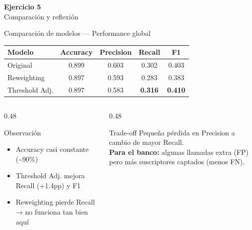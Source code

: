 \documentclass[aspectratio=169, 11pt]{beamer}
\begin{document}
{
\begin{frame}[plain]
\vfill
\begin{center}
{\color{white}\LARGE\bfseries Ejercicio 5}\\[8pt]
{\color{azulclaro}\large Comparación y reflexión}
\end{center}
\vfill
\end{frame}
}

\begin{frame}{Comparación de modelos — Performance global}
\begin{center}
\begin{tabular}{l c c c c}
\toprule
\textbf{Modelo} & \textbf{Accuracy} & \textbf{Precision} & \textbf{Recall} & \textbf{F1} \\
\midrule
\rowcolor{gris10} Original & 0.899 & 0.603 & 0.302 & 0.403 \\
Reweighting & 0.897 & 0.593 & 0.283 & 0.383 \\
\rowcolor{gris10} Threshold Adj. & 0.897 & 0.583 & \textbf{0.316} & \textbf{0.410} \\
\bottomrule
\end{tabular}
\end{center}
\vspace{6pt}
\begin{columns}[T]
\begin{column}{0.48\textwidth}
\begin{block}{Observación}
\begin{itemize}
\item Accuracy casi constante (\textasciitilde90\%)
\item Threshold Adj. mejora Recall (+1.4pp) y F1
\item Reweighting pierde Recall → no funciona tan bien aquí
\end{itemize}
\end{block}
\end{column}
\begin{column}{0.48\textwidth}
\begin{alertblock}{Trade-off}
Pequeña pérdida en Precision a cambio de mayor Recall.\\[4pt]
\textbf{Para el banco:} algunas llamadas extra (FP) pero más suscriptores captados (menos FN).
\end{alertblock}
\end{column}
\end{columns}
\end{frame}
\end{document}
